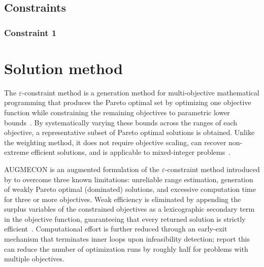 \subsection{Constraints}

    \subsubsection{Constraint 1}

\section{Solution method}

The $\varepsilon$-constraint method is a generation method for multi-objective mathematical programming that produces the Pareto optimal set by optimizing one objective function while constraining the remaining objectives to parametric lower bounds~\cite{mavrotasEffectiveImplementationConstraint2009}. By systematically varying these bounds across the ranges of each objective, a representative subset of Pareto optimal solutions is obtained. Unlike the weighting method, it does not require objective scaling, can recover non-extreme efficient solutions, and is applicable to mixed-integer problems~\cite{mavrotasEffectiveImplementationConstraint2009}.

AUGMECON is an augmented formulation of the $\varepsilon$-constraint method introduced by \citet{mavrotasEffectiveImplementationConstraint2009} to overcome three known limitations: unreliable range estimation, generation of weakly Pareto optimal (dominated) solutions, and excessive computation time for three or more objectives. Weak efficiency is eliminated by appending the surplus variables of the constrained objectives as a lexicographic secondary term in the objective function, guaranteeing that every returned solution is strictly efficient~\cite{mavrotasEffectiveImplementationConstraint2009}. Computational effort is further reduced through an early-exit mechanism that terminates inner loops upon infeasibility detection; \citet{mavrotasEffectiveImplementationConstraint2009} report this can reduce the number of optimization runs by roughly half for problems with multiple objectives.